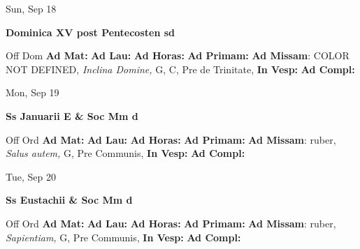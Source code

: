 \documentclass[10pt]{memoir}
\begin{document}
\begin{center}
\begin{minipage}{3.5in}
\vspace{2em}
\begin{center}Sun, Sep 18
\end{center}
\textbf{ \large Dominica XV post Pentecosten
\textnormal{\normalsize sd}}

\begin{justify}Off Dom
\textbf{Ad Mat: }
\textbf{Ad Lau: }
\textbf{Ad Horas: }
\textbf{Ad Primam: }\textbf{Ad Missam}: COLOR NOT DEFINED, \textit{Inclina Domine,} G, C, Pre de Trinitate, 
\textbf{In Vesp: }
\textbf{Ad Compl: }
\end{justify}
\end{minipage}
\end{center}

\begin{center}
\begin{minipage}{3.5in}
\vspace{2em}
\begin{center}Mon, Sep 19
\end{center}
\textbf{ \large Ss Januarii E \& Soc Mm
\textnormal{\normalsize d}}

\begin{justify}Off Ord
\textbf{Ad Mat: }
\textbf{Ad Lau: }
\textbf{Ad Horas: }
\textbf{Ad Primam: }\textbf{Ad Missam}: ruber, \textit{Salus autem,} G, Pre Communis, 
\textbf{In Vesp: }
\textbf{Ad Compl: }
\end{justify}
\end{minipage}
\end{center}

\begin{center}
\begin{minipage}{3.5in}
\vspace{2em}
\begin{center}Tue, Sep 20
\end{center}
\textbf{ \large Ss Eustachii \& Soc Mm
\textnormal{\normalsize d}}

\begin{justify}Off Ord
\textbf{Ad Mat: }
\textbf{Ad Lau: }
\textbf{Ad Horas: }
\textbf{Ad Primam: }\textbf{Ad Missam}: ruber, \textit{Sapientiam,} G, Pre Communis, 
\textbf{In Vesp: }
\textbf{Ad Compl: }
\end{justify}
\end{minipage}
\end{center}
\end{document}
